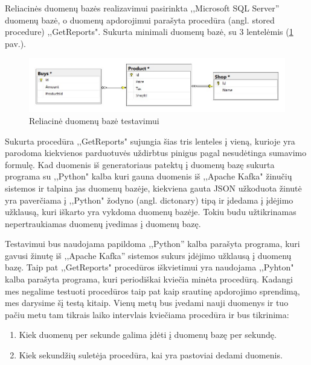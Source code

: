 \documentclass{VUMIFPSkursinis}
\begin{document}
Reliacinės duomenų bazės realizavimui pasirinkta ,,Microsoft SQL Server'' duomenų bazė, o duomenų apdorojimui parašyta procedūra (angl. stored procedure) ,,GetReports".
Sukurta minimali duomenų bazė, su 3 lentelėmis (\ref{fig:dbdiagram} pav.).
\begin{figure}[!htbp]
    \centering
    \includegraphics[width=1\textwidth]{img/dbdiagram.jpg}
    \caption{Reliacinė duomenų bazė testavimui}
    \label{fig:dbdiagram}
\end{figure}
Sukurta procedūra ,,GetReports" sujungia šias tris lenteles į vieną, kurioje yra parodoma kiekvienos parduotuvės uždirbtus pinigus pagal nesudėtinga sumavimo formulę.
Kad duomenis iš generatoriaus patektų į duomenų bazę sukurta programa su ,,Python" kalba kuri gauna duomenis iš ,,Apache Kafka" žinučių sistemos ir talpina jas
duomenų bazėje, kiekviena gauta JSON užkoduota žinutė yra paverčiama į ,,Python" žodyno (angl. dictonary) tipą ir įdedama į įdėjimo užklausą, kuri iškarto yra 
vykdoma duomenų bazėje. Tokiu budu užtikrinamas nepertraukiamas duomenų įvedimas į duomenų bazę.\par
Testavimui bus naudojama papildoma ,,Python'' kalba parašyta programa, kuri gavusi žinutę iš ,,Apache Kafka'' sistemos sukurs įdėjimo užklausą į duomenų bazę.
Taip pat ,,GetReports" procedūros iškvietimui yra naudojama ,,Pyhton" kalba parašyta programa, kuri periodiškai kviečia minėta procedūrą. 
Kadangi mes negalime testuoti procedūros taip pat kaip srautinę apdorojimo sprendimą, mes darysime šį testą kitaip.
Vienų metų bus įvedami nauji duomenys ir tuo pačiu metu tam tikrais laiko intervlais kviečiama procedūra ir bus tikrinima:
    \begin{enumerate}
        \item Kiek duomenų per sekunde galima įdėti į duomenų bazę per sekundę.
        \item Kiek sekundžių suletėja procedūra, kai yra pastoviai dedami duomenis.
    \end{enumerate}
\end{document}
